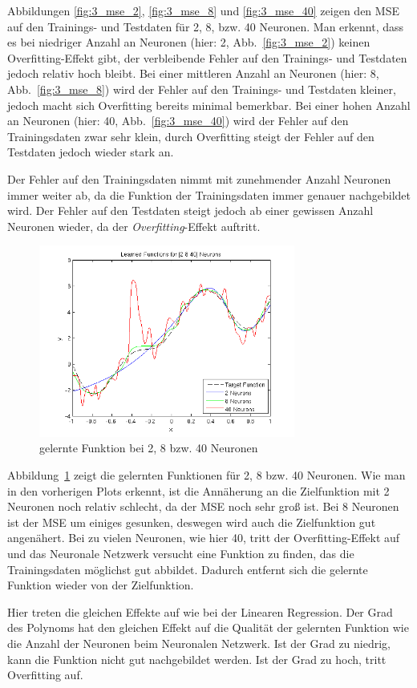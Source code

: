 Abbildungen \ref{fig:3_mse_2}, \ref{fig:3_mse_8} und \ref{fig:3_mse_40} zeigen den MSE auf den Trainings- und Testdaten für 2, 8, bzw. 40 Neuronen. Man erkennt, dass es bei niedriger Anzahl an Neuronen (hier: 2, Abb.~\ref{fig:3_mse_2}) keinen Overfitting-Effekt gibt, der verbleibende Fehler auf den Trainings- und Testdaten jedoch relativ hoch bleibt. Bei einer mittleren Anzahl an Neuronen (hier: 8, Abb.~\ref{fig:3_mse_8}) wird der Fehler auf den Trainings- und Testdaten kleiner, jedoch macht sich Overfitting bereits minimal bemerkbar. Bei einer hohen Anzahl an Neuronen (hier: 40, Abb.~\ref{fig:3_mse_40}) wird der Fehler auf den Trainingsdaten zwar sehr klein, durch Overfitting steigt der Fehler auf den Testdaten jedoch wieder stark an.

Der Fehler auf den Trainingsdaten nimmt mit zunehmender Anzahl Neuronen immer weiter ab, da die Funktion der Trainingsdaten immer genauer nachgebildet wird. Der Fehler auf den Testdaten steigt jedoch ab einer gewissen Anzahl Neuronen wieder, da der \emph{Overfitting}-Effekt auftritt.

\begin{figure}[h!]
  \centering
  \includegraphics[width=0.75\textwidth]{./figures/3/3_learned.png}
  \caption{gelernte Funktion bei 2, 8 bzw. 40 Neuronen}
  \label{fig:3_learned}
\end{figure}

Abbildung~\ref{fig:3_learned} zeigt die gelernten Funktionen für 2, 8 bzw. 40 Neuronen. Wie man in den vorherigen Plots erkennt, ist die Annäherung an die Zielfunktion mit 2 Neuronen noch relativ schlecht, da der MSE noch sehr groß ist. Bei 8 Neuronen ist der MSE um einiges gesunken, deswegen wird auch die Zielfunktion gut angenähert. Bei zu vielen Neuronen, wie hier 40, tritt der Overfitting-Effekt auf und das Neuronale Netzwerk versucht eine Funktion zu finden, das die Trainingsdaten möglichst gut abbildet. Dadurch entfernt sich die gelernte Funktion wieder von der Zielfunktion.

Hier treten die gleichen Effekte auf wie bei der Linearen Regression. Der Grad des Polynoms hat den gleichen Effekt auf die Qualität der gelernten Funktion wie die Anzahl der Neuronen beim Neuronalen Netzwerk. Ist der Grad zu niedrig, kann die Funktion nicht gut nachgebildet werden. Ist der Grad zu hoch, tritt Overfitting auf.

\clearpage